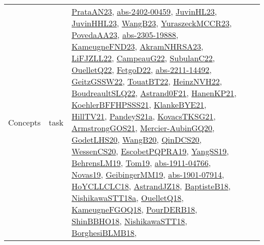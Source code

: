 {\begin{longtable}{lp{3cm}>{\raggedright}p{6cm}>{\raggedright}p{6cm}p{8cm}}
Concepts & task & \href{articles/PrataAN23.pdf}{PrataAN23}\cite{PrataAN23}, \href{articles/abs-2402-00459.pdf}{abs-2402-00459}\cite{abs-2402-00459}, \href{papers/JuvinHL23.pdf}{JuvinHL23}\cite{JuvinHL23}, \href{papers/JuvinHHL23.pdf}{JuvinHHL23}\cite{JuvinHHL23}, \href{papers/WangB23.pdf}{WangB23}\cite{WangB23}, \href{articles/YuraszeckMCCR23.pdf}{YuraszeckMCCR23}\cite{YuraszeckMCCR23}, \href{papers/PovedaAA23.pdf}{PovedaAA23}\cite{PovedaAA23}, \href{articles/abs-2305-19888.pdf}{abs-2305-19888}\cite{abs-2305-19888}, \href{papers/KameugneFND23.pdf}{KameugneFND23}\cite{KameugneFND23}, \href{articles/AkramNHRSA23.pdf}{AkramNHRSA23}\cite{AkramNHRSA23}, \href{papers/LiFJZLL22.pdf}{LiFJZLL22}\cite{LiFJZLL22}, \href{articles/CampeauG22.pdf}{CampeauG22}\cite{CampeauG22}, \href{articles/SubulanC22.pdf}{SubulanC22}\cite{SubulanC22}, \href{papers/OuelletQ22.pdf}{OuelletQ22}\cite{OuelletQ22}, \href{articles/FetgoD22.pdf}{FetgoD22}\cite{FetgoD22}, \href{articles/abs-2211-14492.pdf}{abs-2211-14492}\cite{abs-2211-14492}, \href{papers/GeitzGSSW22.pdf}{GeitzGSSW22}\cite{GeitzGSSW22}, \href{papers/TouatBT22.pdf}{TouatBT22}\cite{TouatBT22}, \href{articles/HeinzNVH22.pdf}{HeinzNVH22}\cite{HeinzNVH22}, \href{papers/BoudreaultSLQ22.pdf}{BoudreaultSLQ22}\cite{BoudreaultSLQ22}, \href{papers/Astrand0F21.pdf}{Astrand0F21}\cite{Astrand0F21}, \href{papers/HanenKP21.pdf}{HanenKP21}\cite{HanenKP21}, \href{articles/KoehlerBFFHPSSS21.pdf}{KoehlerBFFHPSSS21}\cite{KoehlerBFFHPSSS21}, \href{papers/KlankeBYE21.pdf}{KlankeBYE21}\cite{KlankeBYE21}, \href{papers/HillTV21.pdf}{HillTV21}\cite{HillTV21}, \href{articles/PandeyS21a.pdf}{PandeyS21a}\cite{PandeyS21a}, \href{papers/KovacsTKSG21.pdf}{KovacsTKSG21}\cite{KovacsTKSG21}, \href{papers/ArmstrongGOS21.pdf}{ArmstrongGOS21}\cite{ArmstrongGOS21}, \href{papers/Mercier-AubinGQ20.pdf}{Mercier-AubinGQ20}\cite{Mercier-AubinGQ20}, \href{papers/GodetLHS20.pdf}{GodetLHS20}\cite{GodetLHS20}, \href{papers/WangB20.pdf}{WangB20}\cite{WangB20}, \href{articles/QinDCS20.pdf}{QinDCS20}\cite{QinDCS20}, \href{papers/WessenCS20.pdf}{WessenCS20}\cite{WessenCS20}, \href{articles/EscobetPQPRA19.pdf}{EscobetPQPRA19}\cite{EscobetPQPRA19}, \href{papers/YangSS19.pdf}{YangSS19}\cite{YangSS19}, \href{papers/BehrensLM19.pdf}{BehrensLM19}\cite{BehrensLM19}, \href{papers/Tom19.pdf}{Tom19}\cite{Tom19}, \href{articles/abs-1911-04766.pdf}{abs-1911-04766}\cite{abs-1911-04766}, \href{articles/Novas19.pdf}{Novas19}\cite{Novas19}, \href{papers/GeibingerMM19.pdf}{GeibingerMM19}\cite{GeibingerMM19}, \href{articles/abs-1901-07914.pdf}{abs-1901-07914}\cite{abs-1901-07914}, \href{papers/HoYCLLCLC18.pdf}{HoYCLLCLC18}\cite{HoYCLLCLC18}, \href{papers/AstrandJZ18.pdf}{AstrandJZ18}\cite{AstrandJZ18}, \href{articles/BaptisteB18.pdf}{BaptisteB18}\cite{BaptisteB18}, \href{papers/NishikawaSTT18a.pdf}{NishikawaSTT18a}\cite{NishikawaSTT18a}, \href{papers/OuelletQ18.pdf}{OuelletQ18}\cite{OuelletQ18}, \href{papers/KameugneFGOQ18.pdf}{KameugneFGOQ18}\cite{KameugneFGOQ18}, \href{articles/PourDERB18.pdf}{PourDERB18}\cite{PourDERB18}, \href{articles/ShinBBHO18.pdf}{ShinBBHO18}\cite{ShinBBHO18}, \href{papers/NishikawaSTT18.pdf}{NishikawaSTT18}\cite{NishikawaSTT18}, \href{articles/BorghesiBLMB18.pdf}{BorghesiBLMB18}\cite{BorghesiBLMB18}, 
\end{longtable}}
